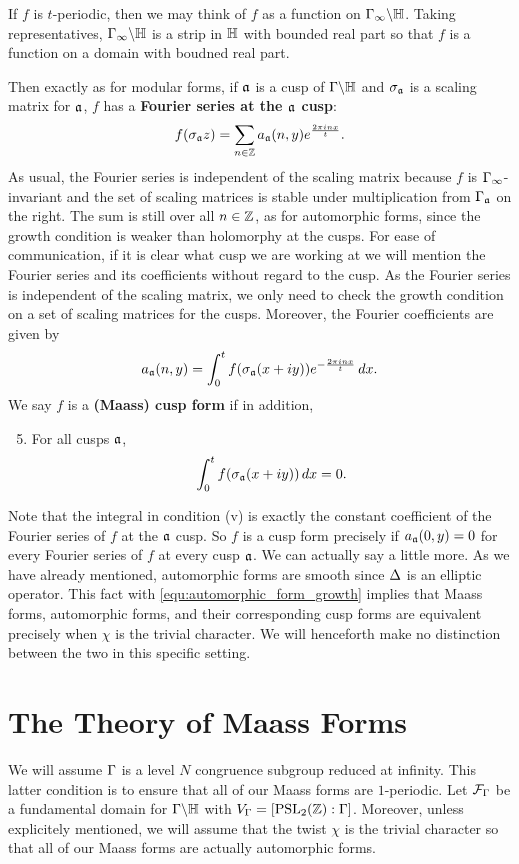       \begin{remark}
        If $f$ is $t$-periodic, then we may think of $f$ as a function on $\Gamma_{\infty}\backslash\mathbb{H}$. Taking representatives, $\Gamma_{\infty}\backslash\mathbb{H}$ is a strip in $\mathbb{H}$ with bounded real part so that $f$ is a function on a domain with boudned real part.
      \end{remark}

      Then exactly as for modular forms, if $\mathfrak{a}$ is a cusp of $\Gamma\backslash\mathbb{H}$ and $\sigma_{\mathfrak{a}}$ is a scaling matrix for $\mathfrak{a}$, $f$ has a \textbf{Fourier series at the $\mathfrak{a}$ cusp}:
      \[
        f(\sigma_{\mathfrak{a}}z) = \sum_{n \in \mathbb{Z}}a_{\mathfrak{a}}(n,y)e^{\frac{2\pi inx}{t}}.
      \]
      As usual, the Fourier series is independent of the scaling matrix because $f$ is $\Gamma_{\infty}$-invariant and the set of scaling matrices is stable under multiplication from $\Gamma_{\mathfrak{a}}$ on the right. The sum is still over all $n \in \mathbb{Z}$, as for automorphic forms, since the growth condition is weaker than holomorphy at the cusps. For ease of communication, if it is clear what cusp we are working at we will mention the Fourier series and its coefficients without regard to the cusp. As the Fourier series is independent of the scaling matrix, we only need to check the growth condition on a set of scaling matrices for the cusps. Moreover, the Fourier coefficients are given by
      \[
        a_{\mathfrak{a}}(n,y) = \int_{0}^{t}f(\sigma_{\mathfrak{a}}(x+iy))e^{-\frac{2\pi inx}{t}}\,dx.
      \]
      We say $f$ is a \textbf{(Maass) cusp form} if in addition,
      \begin{enumerate}[label=(\roman*)]
        \setcounter{enumi}{4}
        \item For all cusps $\mathfrak{a}$,
        \[
          \int_{0}^{t}f(\sigma_{\mathfrak{a}}(x+iy))\,dx = 0.
        \]
      \end{enumerate}
      Note that the integral in condition (v) is exactly the constant coefficient of the Fourier series of $f$ at the $\mathfrak{a}$ cusp. So $f$ is a cusp form precisely if $a_{\mathfrak{a}}(0,y) = 0$ for every Fourier series of $f$ at every cusp $\mathfrak{a}$. We can actually say a little more. As we have already mentioned, automorphic forms are smooth since $\Delta$ is an elliptic operator. This fact with \cref{equ:automorphic_form_growth} implies that Maass forms, automorphic forms, and their corresponding cusp forms are equivalent precisely when $\chi$ is the trivial character. We will henceforth make no distinction between the two in this specific setting.
  \section{The Theory of Maass Forms}
    We will assume $\Gamma$ is a level $N$ congruence subgroup reduced at infinity. This latter condition is to ensure that all of our Maass forms are $1$-periodic. Let $\mathcal{F}_{\Gamma}$ be a fundamental domain for $\Gamma\backslash\mathbb{H}$ with $V_{\Gamma} = [\mathrm{PSL}_{2}(\mathbb{Z}):\Gamma]$. Moreover, unless explicitely mentioned, we will assume that the twist $\chi$ is the trivial character so that all of our Maass forms are actually automorphic forms.

